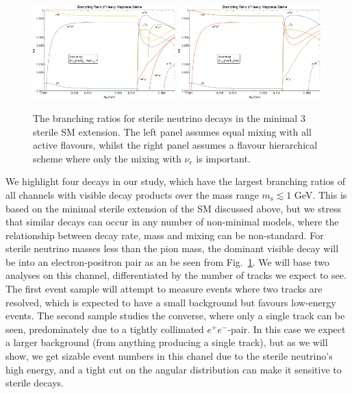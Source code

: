\documentclass[11pt, a4paper]{article}
\newcommand{\reffig}[1]{Fig.~\ref{#1}}
\begin{document}
\begin{figure}[t]
\includegraphics[width=0.49\textwidth]{figures/bounds1.pdf}  \includegraphics[width=0.49\textwidth]{figures/bounds2.pdf}
\caption{\label{fig:branchingratios}The branching ratios for sterile neutrino decays in the minimal 3 sterile SM extension. The left panel assumes equal mixing with all active flavours, whilst the right panel assumes a flavour hierarchical scheme where only the mixing with $\nu_e$ is important.}
\end{figure}

We highlight four decays in our study, which have the largest branching ratios
of all channels with visible decay products over the mass range $m_\text{s}
\lesssim 1$ GeV. This is based on the minimal sterile extension of the SM
discussed above, but we stress that similar decays can occur in any number of
non-minimal models, where the relationship between decay rate, mass and mixing
can be non-standard. For sterile neutrino masses less than the pion mass, the
dominant visible decay will be into an electron-positron pair as an be seen
from \reffig{fig:branchingratios}. We will base two analyses on this channel,
differentiated by the number of tracks we expect to see. The first event sample
will attempt to measure events where two tracks are resolved, which is expected
to have a small background but favours low-energy events. The second sample
studies the converse, where only a single track can be seen, predominately due
to a tightly collimated $e^+e^-$-pair. In this case we expect a larger
background (from anything producing a single track), but as we will show, we
get sizable event numbers in this chanel due to the sterile neutrino's high
energy, and a tight cut on the angular distribution can make it sensitive to
sterile decays.
\end{document}
